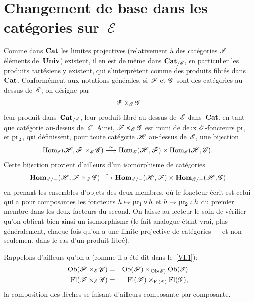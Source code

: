 \section{Changement de base dans les cat\'egories sur~$\mathcal{E}$}
\label{VI.3}

Comme dans $\mathbf{Cat}$ les limites projectives (relativement \`a des
cat\'egories $\cal{I}$ \'el\'ements de~$\mathbf{Univ}$) existent, il en
est de m\^eme dans $\Cat_{/\cal{E}}$, en particulier les produits
cart\'esiens y existent, qui s'interpr\`etent comme des produits
fibr\'es dans~$\mathbf{Cat}$. Conform\'ement aux notations
g\'en\'erales, si $\cal{F}$ et $\cal{G}$ sont des cat\'egories
au-dessus de~$\cal{E}$, on d\'esigne par
$$
\cal{F}\times_{\cal{E}}\cal{G}
$$
\label{indnot:fk}leur produit dans~$\Cat_{/\cal{E}}$, \ie leur produit fibr\'e
au-dessus de~$\cal{E}$ dans~$\mathbf{Cat}$,
en tant que cat\'egorie au-dessus de~$\cal{E}$. Ainsi,
$\cal{F}\times_{\cal{E}} \cal{G}$ est muni de deux $\cal{E}$-foncteurs
$\mathrm{pr}_1$ et $\mathrm{pr}_2$, qui d\'efinissent, pour toute cat\'egorie
$\cal{H}$ au-dessus de~$\cal{E}$, une bijection
$$
\Hom_{\cal{E}}(\cal{H},\cal{F}\times_{\cal{E}}\cal{G})\isomto
\Hom_{\cal{E}}(\cal{H},\cal{F})\times\Hom_{\cal{E}}(\cal{H},\cal{G}).
$$
Cette bijection provient d'ailleurs d'un isomorphisme de
cat\'egories
$$
\SheafHom_{\cal{E}/-}(\cal{H},\cal{F}\times_{\cal{E}}
\cal{G})\isomto\SheafHom_{\cal{E}/-}(\cal{H},\cal{F})\times
\SheafHom_{\cal{E}/-}(\cal{H},\cal{G})
$$
en prenant les ensembles d'objets des deux membres, o\`u le foncteur
\'ecrit est celui qui a pour composantes les foncteurs $h\mto
\pr_1\circ h$ et $h\mto \pr_2\circ h$ du premier membre dans les deux
facteurs du second. On laisse au lecteur le soin de v\'erifier qu'on
obtient bien ainsi un isomorphisme (le fait analogue \'etant vrai,
plus g\'en\'eralement, chaque fois qu'on a une limite projective
de cat\'egories --- et non seulement dans le cas d'un produit
fibr\'e).

Rappelons d'ailleurs qu'on a (comme il a \'et\'e dit dans
le~\No \ref{VI.1}):
\begin{eqnarray*}
\Ob(\cal{F}\times_\cal{E}\cal{G})&=&
\Ob(\cal{F})\times_{\Ob(\cal{E})}\Ob(\cal{G})\\
\Fl(\cal{F}\times_\cal{E}\cal{G})&=&
\Fl(\cal{F})\times_{\Fl(\cal{E})}\Fl(\cal{G})\quoi,
\end{eqnarray*}
la composition des fl\`eches se faisant d'ailleurs composante par
composante.

